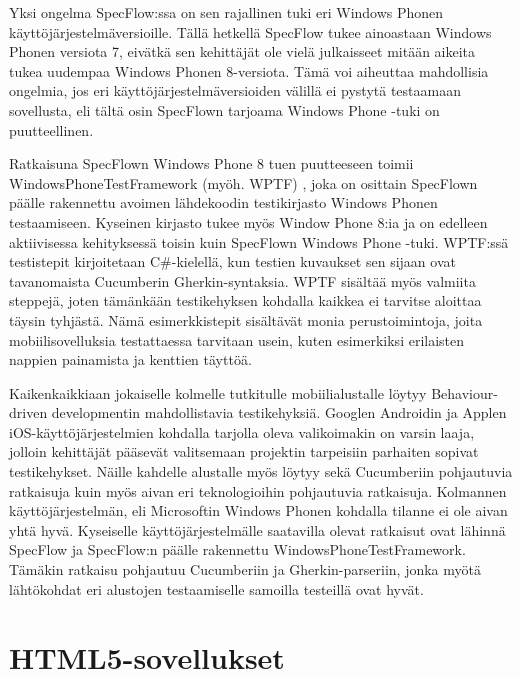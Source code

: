 \documentclass[finnish,nonumbib,nocopyright]{gradu2}
\begin{document}
Yksi ongelma SpecFlow:ssa on sen rajallinen tuki eri Windows Phonen käyttöjärjestelmäversioille. Tällä hetkellä SpecFlow tukee ainoastaan Windows Phonen versiota 7, eivätkä sen kehittäjät ole vielä julkaisseet mitään aikeita tukea uudempaa Windows Phonen 8-versiota. Tämä voi aiheuttaa mahdollisia ongelmia, jos eri käyttöjärjestelmäversioiden välillä ei pystytä testaamaan sovellusta, eli tältä osin SpecFlown tarjoama Windows Phone -tuki on puutteellinen.

Ratkaisuna SpecFlown Windows Phone 8 tuen puutteeseen toimii WindowsPhoneTestFramework (myöh. WPTF) \cite{wptf}, joka on osittain SpecFlown päälle rakennettu avoimen lähdekoodin testikirjasto Windows Phonen testaamiseen. Kyseinen kirjasto tukee myös Window Phone 8:ia ja on edelleen aktiivisessa kehityksessä toisin kuin SpecFlown Windows Phone -tuki. WPTF:ssä testistepit kirjoitetaan C\#-kielellä, kun testien kuvaukset sen sijaan ovat tavanomaista Cucumberin Gherkin-syntaksia. WPTF sisältää myös valmiita steppejä, joten tämänkään testikehyksen kohdalla kaikkea ei tarvitse aloittaa täysin tyhjästä. Nämä esimerkkistepit sisältävät monia perustoimintoja, joita mobiilisovelluksia testattaessa tarvitaan usein, kuten esimerkiksi erilaisten nappien painamista ja kenttien täyttöä.

Kaikenkaikkiaan jokaiselle kolmelle tutkitulle mobiilialustalle löytyy Behaviour-driven developmentin mahdollistavia testikehyksiä. Googlen Androidin ja Applen iOS-käyttöjärjestelmien kohdalla tarjolla oleva valikoimakin on varsin laaja, jolloin kehittäjät pääsevät valitsemaan projektin tarpeisiin parhaiten sopivat testikehykset. Näille kahdelle alustalle myös löytyy sekä Cucumberiin pohjautuvia ratkaisuja kuin myös aivan eri teknologioihin pohjautuvia ratkaisuja. Kolmannen käyttöjärjestelmän, eli Microsoftin Windows Phonen kohdalla tilanne ei ole aivan yhtä hyvä. Kyseiselle käyttöjärjestelmälle saatavilla olevat ratkaisut ovat lähinnä SpecFlow ja SpecFlow:n päälle rakennettu WindowsPhoneTestFramework. Tämäkin ratkaisu pohjautuu Cucumberiin ja Gherkin-parseriin, jonka myötä lähtökohdat eri alustojen testaamiselle samoilla testeillä ovat hyvät.

\section{HTML5-sovellukset}
\end{document}
